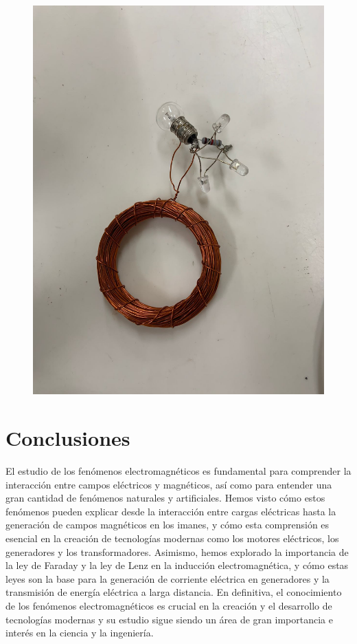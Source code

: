 \documentclass[twocolumn, 12pt]{article}
\begin{document}
\begin{figure}[H]
	\includegraphics[width=0.9\linewidth]{./Images/Foquito.jpeg}
\end{figure}

\section{Conclusiones}

El estudio de los fenómenos electromagnéticos es
fundamental para comprender la interacción entre campos
eléctricos y magnéticos, así como para entender una gran
cantidad de fenómenos naturales y artificiales. Hemos visto
cómo estos fenómenos pueden explicar desde la interacción
entre cargas eléctricas hasta la generación de campos
magnéticos en los imanes, y cómo esta comprensión es
esencial en la creación de tecnologías modernas como los
motores eléctricos, los generadores y los transformadores.
Asimismo, hemos explorado la importancia de la ley de
Faraday y la ley de Lenz en la inducción electromagnética,
y cómo estas leyes son la base para la generación de
corriente eléctrica en generadores y la transmisión de
energía eléctrica a larga distancia. En definitiva, el
conocimiento de los fenómenos electromagnéticos es crucial
en la creación y el desarrollo de tecnologías modernas y su
estudio sigue siendo un área de gran importancia e interés
en la ciencia y la ingeniería.

\printbibliography
\end{document}
